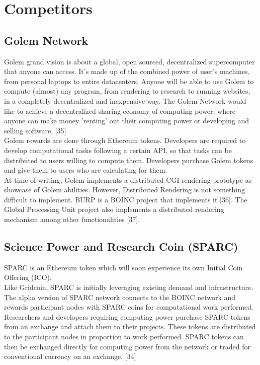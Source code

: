 \section{Competitors}

\subsection{Golem Network}

Golem grand vision is about a global, open sourced, decentralized supercomputer that anyone can access. It's made up of the combined power of user's machines, from personal laptops to entire datacenters. Anyone will be able to use Golem to compute (almost) any program, from rendering to research to running websites, in a completely decentralized and inexpensive way. The Golem Network would like to achieve a decentralized sharing economy of computing power, where anyone can make money 'renting' out their computing power or developing and selling software. [35]\\

Golem rewards are done through Ethereum tokens. Developers are required to develop computational tasks following a certain API, so that tasks can be distributed to users willing to compute them. Developers purchase Golem tokens and give them to users who are calculating for them.\\

At time of writing, Golem implements a distributed CGI rendering prototype as showcase of Golem abilities. However, Distributed Rendering is not something difficult to implement. BURP is a BOINC project that implements it [36]. The Global Processing Unit project also implements a distributed rendering mechanism among other functionalities [37].\\


\subsection{Science Power and Research Coin (SPARC)}

SPARC is an Ethereum token which will soon experience its own Initial Coin Offering (ICO).\\

Like Gridcoin, SPARC is initially leveraging existing demand and infrastructure.
The alpha version of SPARC network
connects to the BOINC network and rewards participant nodes with SPARC coins for computational work performed. Researchers and developers requiring
computing power purchase SPARC tokens from an exchange and attach them to their projects.
These tokens are distributed to the participant nodes in proportion to work performed. SPARC
tokens can then be exchanged directly for computing power from the network or traded for
conventional currency on an exchange. [34]\\

